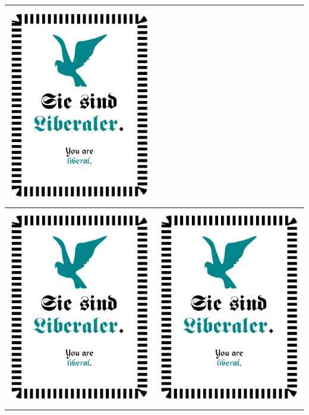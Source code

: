 \documentclass[12pt,a4paper,spanish]{article}
\begin{document}
\begin{table}
\begin{tabular}{|c|c|}
			\includegraphics[height=8.7cm, angle=90]{./Drawings/role_liberal.pdf} \\
			\midrule
			\includegraphics[height=8.7cm, angle=90]{./Drawings/role_liberal.pdf} &
			\includegraphics[height=8.7cm, angle=90]{./Drawings/role_liberal.pdf} \\

\end{tabular}
\end{table}
\end{document}
